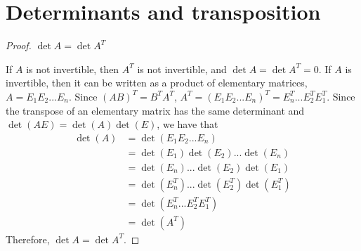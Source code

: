 \section{Determinants and transposition}

\begin{proof} $\det A = \det A^T$\gap

    If $A$ is not invertible, then $A^T$ is not invertible, 
    and $\det A = \det A^T = 0$.
    If $A$ is invertible, then it can be written 
    as a product of elementary matrices, 
    $A = E_1E_2...E_n$.
    Since $(AB)^T = B^T A^T$,
    $A^T = (E_1E_2...E_n)^T = E_n^T...E_2^TE_1^T$.
    Since the transpose of an elementary matrix 
    has the same determinant and
    $\det(AE) = \det(A)\det(E)$, 
    we have that
    \begin{align}
        \det(A) 
        &= \det(E_1E_2...E_n)\\
        &= \det(E_1)\det(E_2)...\det(E_n)\\
        &= \det(E_n)...\det(E_2)\det(E_1)\\
        &= \det(E_n^T)...\det(E_2^T)\det(E_1^T)\\
        &= \det(E_n^T...E_2^T E_1^T)\\
        &= \det(A^T)
    \end{align}
    Therefore, $\det A = \det A^T$.
\end{proof}